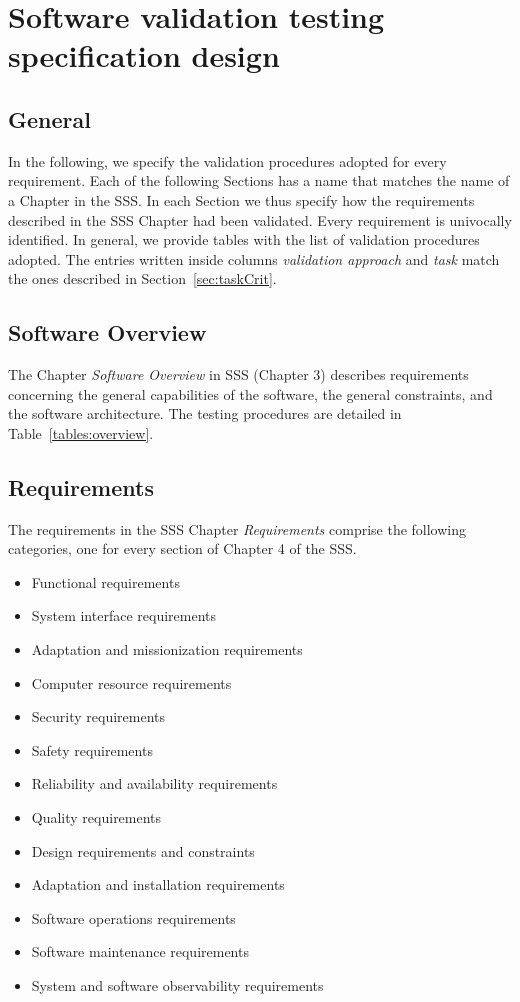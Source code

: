 \chapter{Software validation testing specification design}

\section{General}

In the following, we specify the validation procedures adopted for every requirement. Each of the following Sections has a name that matches the name of a Chapter in the SSS. In each Section we thus specify how the requirements described in the SSS Chapter had been validated.
Every requirement is univocally identified. In general, we provide tables with the list of validation procedures adopted.
The entries written inside columns \emph{validation approach} and \emph{task} match the ones described in Section~\ref{sec:taskCrit}.

\section{Software Overview}
The Chapter \emph{Software Overview} in SSS (Chapter 3) describes requirements concerning the general capabilities of the software, the general constraints, and the software architecture.
The testing procedures are detailed in Table~\ref{tables:overview}.



\clearpage
\section{Requirements}

The requirements in the SSS Chapter \emph{Requirements} comprise the following categories, one for every section of Chapter 4 of the SSS.

\begin{itemize}
  \item Functional requirements
  \item System interface requirements
  \item Adaptation and missionization requirements
  \item Computer resource requirements
  \item Security requirements
  \item Safety requirements
  \item Reliability and availability requirements
  \item Quality requirements
  \item Design requirements and constraints
  \item Adaptation and installation requirements
  \item Software operations requirements
  \item Software maintenance requirements
  \item System and software observability requirements
\end{itemize}

